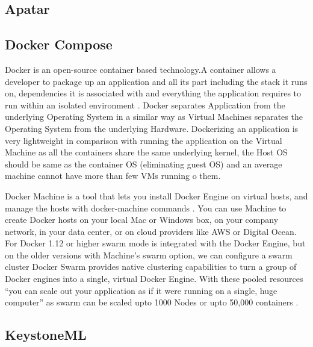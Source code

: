 \subsection{Apatar}

\pv

\subsection{Docker Compose}

    Docker is an open-source container based technology.A container
    allows a developer to package up an application and all its part
    including the stack it runs on, dependencies it is associated with
    and everything the application requires to run within an isolated
    environment . Docker separates Application from the underlying
    Operating System in a similar way as Virtual Machines separates
    the Operating System from the underlying Hardware. Dockerizing an
    application is very lightweight in comparison with running the
    application on the Virtual Machine as all the containers share the
    same underlying kernel, the Host OS should be same as the
    container OS (eliminating guest OS) and an average machine cannot
    have more than few VMs running o them.

    Docker Machine is a tool that lets you install Docker Engine on
    virtual hosts, and manage the hosts with docker-machine commands
    \cite{docker-book}. You can use Machine to create Docker hosts on
    your local Mac or Windows box, on your company network, in your
    data center, or on cloud providers like AWS or Digital Ocean. For
    Docker 1.12 or higher swarm mode is integrated with the Docker
    Engine, but on the older versions with Machine's swarm option, we
    can configure a swarm cluster Docker Swarm provides native
    clustering capabilities to turn a group of Docker engines into a
    single, virtual Docker Engine. With these pooled resources ``you
    can scale out your application as if it were running on a single,
    huge computer'' as swarm can be scaled upto 1000
    Nodes or upto 50,000 containers \cite{www-docker}.

    \pv
    
\subsection{KeystoneML}
    
